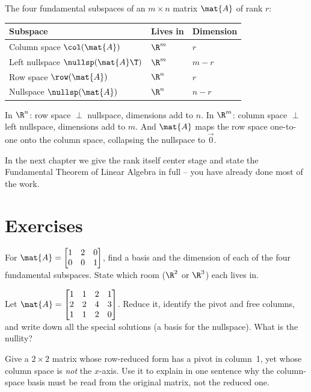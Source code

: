 \begin{focusbox}
The four fundamental subspaces of an $m\times n$ matrix $\mat{A}$ of rank $r$:
\begin{center}
\begin{tabular}{lll}
\toprule
Subspace & Lives in & Dimension \\
\midrule
Column space $\col(\mat{A})$ & $\R^m$ & $r$ \\
Left nullspace $\nullsp(\mat{A}\T)$ & $\R^m$ & $m-r$ \\
Row space $\row(\mat{A})$ & $\R^n$ & $r$ \\
Nullspace $\nullsp(\mat{A})$ & $\R^n$ & $n-r$ \\
\bottomrule
\end{tabular}
\end{center}
In $\R^n$: row space $\perp$ nullspace, dimensions add to $n$.
In $\R^m$: column space $\perp$ left nullspace, dimensions add to $m$.
And $\mat{A}$ maps the row space one-to-one onto the column space, collapsing the nullspace to
$\vec{0}$.
\end{focusbox}

In the next chapter we give the rank itself center stage and state the
Fundamental Theorem of Linear Algebra in full -- you have already done most of the work.

\section{Exercises}

\begin{exercise}\label{ch15:ex-basic}
For $\mat{A}=\begin{bmatrix}1&2&0\\0&0&1\end{bmatrix}$, find a basis and the dimension of each of
the four fundamental subspaces. State which room ($\R^2$ or $\R^3$) each lives in.
\end{exercise}

\begin{exercise}\label{ch15:ex-special}
Let $\mat{A}=\begin{bmatrix}1&1&2&1\\2&2&4&3\\1&1&2&0\end{bmatrix}$. Reduce it, identify the
pivot and free columns, and write down all the special solutions (a basis for the nullspace).
What is the nullity?
\end{exercise}

\begin{exercise}\label{ch15:ex-colspace-trap}
Give a $2\times2$ matrix whose row-reduced form has a pivot in column~1, yet whose column space is
\emph{not} the $x$-axis. Use it to explain in one sentence why the column-space basis must be read
from the original matrix, not the reduced one.
\end{exercise}

